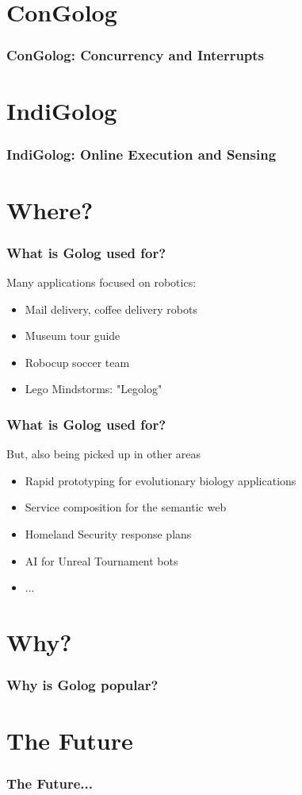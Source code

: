 \documentclass{beamer}
\begin{document}
\section{ConGolog}
\begin{frame}
\frametitle{ConGolog: Concurrency and Interrupts}
\end{frame}

\section{IndiGolog}
\begin{frame}
\frametitle{IndiGolog: Online Execution and Sensing}
\end{frame}

\section{Where?}
\begin{frame}
\frametitle{What is Golog used for?}
Many applications focused on robotics:
\begin{itemize}
  \item Mail delivery, coffee delivery robots
  \item Museum tour guide
  \item Robocup soccer team
  \item Lego Mindstorms: "Legolog"
\end{itemize}
\end{frame}
\begin{frame}
\frametitle{What is Golog used for?}
But, also being picked up in other areas
\begin{itemize}
  \item Rapid prototyping for evolutionary biology applications
  \item Service composition for the semantic web
  \item Homeland Security response plans
  \item AI for Unreal Tournament bots
  \item ...
\end{itemize}
\end{frame}

\section{Why?}
\begin{frame}
\frametitle{Why is Golog popular?}
\end{frame}


\section{The Future}
\begin{frame}
\frametitle{The Future...}
\end{frame}
\end{document}
